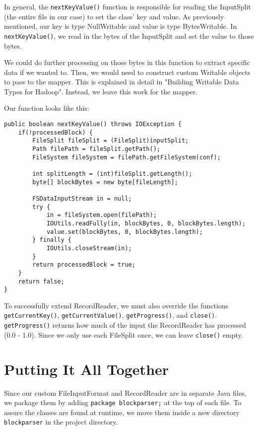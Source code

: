 \documentclass[9pt,twocolumn,twoside]{idsi}
\begin{document}
In general, the \lstinline{nextKeyValue()} function is responsible for reading the InputSplit (the entire file in our case) to set the class' key and value. As previously mentioned, our key is type NullWritable and value is type BytesWritable. In \lstinline{nextKeyValue()}, we read in the bytes of the InputSplit and set the value to those bytes.

We could do further processing on those bytes in this function to extract specific data if we wanted to. Then, we would need to construct custom Writable objects to pass to the mapper. This is explained in detail in "Building Writable Data Types for Hadoop". Instead, we leave this work for the mapper.

Our function looks like this:

\begin{lstlisting}
public boolean nextKeyValue() throws IOException {
    if(!processedBlock) {
        FileSplit fileSplit = (FileSplit)inputSplit;
        Path filePath = fileSplit.getPath();
        FileSystem fileSystem = filePath.getFileSystem(conf);

        int splitLength = (int)fileSplit.getLength();
        byte[] blockBytes = new byte[fileLength];

        FSDataInputStream in = null;
        try {
            in = fileSystem.open(filePath);
            IOUtils.readFully(in, blockBytes, 0, blockBytes.length);
            value.set(blockBytes, 0, blockBytes.length);
        } finally {
            IOUtils.closeStream(in);
        }
        return processedBlock = true;
    }
    return false;
}
\end{lstlisting}

To successfully extend RecordReader, we must also override the functions \lstinline{getCurrentKey()}, \lstinline{getCurrentValue()}, \lstinline{getProgress()}, and \lstinline{close()}. \lstinline{getProgress()} returns how much of the input the RecordReader has processed (0.0 - 1.0). Since we only use each FileSplit once, we can leave \lstinline{close()} empty.

\section{Putting It All Together}

Since our custom FileInputFormat and RecordReader are in separate Java files, we package them by adding \lstinline{package blockparser;} at the top of each file. To assure the classes are found at runtime, we move them inside a new directory \lstinline{blockparser} in the project directory.
\end{document}
